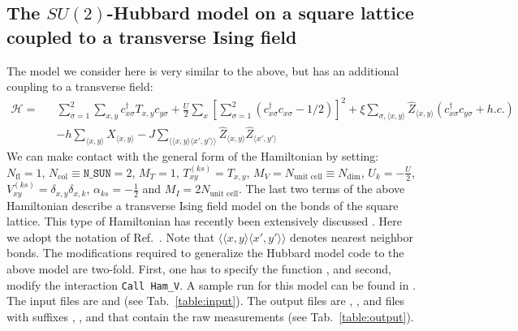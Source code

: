 \documentclass{SciPost}
\begin{document}
\subsection{The $SU(2)$-Hubbard model on a square lattice coupled to a transverse Ising field}\label{sec:walk2}
%
The model we consider here  is very similar to the  above,  but has an additional coupling to a transverse field: 
\begin{eqnarray}
\label{eqn_hubbard_sun_Ising}
\mathcal{H}= & & 
\sum\limits_{\sigma=1}^{2} 
\sum\limits_{x,y } 
  c^{\dagger}_{x \sigma} T_{x,y}c^{\phantom\dagger}_{y \sigma} 
+ \frac{U}{2}\sum\limits_{x}\left[
\sum\limits_{\sigma=1}^{2}
\left(  c^{\dagger}_{x \sigma} c^{\phantom\dagger}_{x \sigma}  -1/2 \right) \right]^{2}   
+  \xi \sum_{\sigma,\langle x,y \rangle} \hat{Z}_{\langle x,y \rangle}  \left( c^{\dagger}_{x \sigma} c^{\phantom\dagger}_{y \sigma}  + h.c. \right)  \nonumber \\ 
 & & - h \sum_{\langle x,y \rangle} \hat{X}_{\langle x,y \rangle}   - J \sum_{\langle \langle x,y \rangle \langle x',y' \rangle \rangle} 
  \hat{Z}_{\langle x,y \rangle}   \hat{Z}_{\langle x',y' \rangle} 
\end{eqnarray}
We can make contact with the general form of the Hamiltonian by setting: 
$N_{\mathrm{fl}} = 1$, $N_{\mathrm{col}} \equiv \texttt{N\_SUN}     =2 $,   $M_T    =    1$,  $T^{(ks)}_{x y}   =  T_{x,y}$,  $M_V   =  N_{\text{unit cell}} \equiv N_{\mathrm{dim}}$,  $U_{k}       =   -\frac{U}{2}$, 
 $V_{x y}^{(ks)} =  \delta_{x,y} \delta_{x,k}$,  $\alpha_{ks}   = - \frac{1}{2}  $ and $M_I       = 2 N_{\text{unit cell}} $.  
 The last two terms of the  above Hamiltonian describe a transverse Ising field model on the bonds of the square lattice.  This  type of Hamiltonian  has  recently been extensively discussed  \cite{Schattner15,Xu16,Assaad16}.  Here we adopt the notation of Ref.~\cite{Assaad16}. Note that   $\langle \langle x,y \rangle \langle x',y' \rangle \rangle $ denotes nearest neighbor bonds.
The modifications  required to generalize the Hubbard model code to the above model are two-fold. 
First,  one has to specify the function , and  second,  modify the interaction \texttt{Call Ham\_V}.
A sample run for this model can be found in .
The input files are  and  (see Tab.~\ref{table:input}). The output files are , , and files with suffixes , , and  that 
contain the raw measurements (see Tab.~\ref{table:output}).
%
\end{document}
